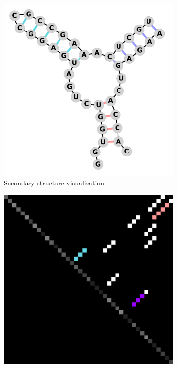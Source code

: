 \captionsetup[subfigure]{justification=centering}
\begin{figure}[h]
\centering
\begin{subfigure}{.33\textwidth}
  \centering
  \hbox{\includegraphics[width=\linewidth]{pics/struct.pdf}}
  \caption{Secondary structure visualization}
  \label{struc_a}
\end{subfigure}%
\begin{subfigure}{.33\textwidth}
  \centering
  \hbox{\includegraphics[width=\linewidth]{pics/in.png}}

\end{subfigure}
\end{figure}
